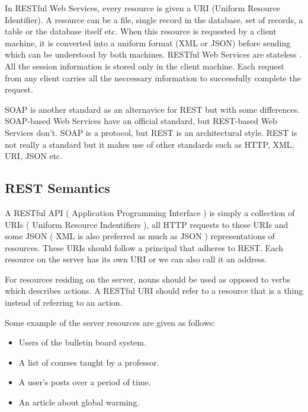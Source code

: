 \hspace*{0.2in}In RESTful Web Services, every resource is given a URI (Uniform Resource Identifier). A resource can be a file, single record in the database, set of records, a table or the database itself etc. When this resource is requested by a client machine, it is converted into a uniform format (XML or JSON) before sending which can be understood by both machines.  RESTful Web Services are stateless \cite{stateless}. All the session information is stored only in the client machine. Each request from any client carries all the neccessary information to successfully complete the request.

\hspace*{0.2in}SOAP \cite{soap} is another standard as an alternavice for REST but with some differences. SOAP-based Web Services have an official standard, but REST-based Web Services don't.  SOAP is a protocol, but REST is an architectural style. REST is not really a standard but it makes use of other standards such as HTTP, XML, URI, JSON etc.

\subsection{REST Semantics}

\hspace*{0.2in}A RESTful API ( Application Programming Interface ) is simply a collection of URIs ( Uniform Resource Indentifiers ), all HTTP requests to these URIs and some JSON ( XML is also preferred as much as JSON ) representations of resources. These URIs should follow a principal that adheres to REST. Each resource on the server has its own URI or we can also call it an address.

\hspace*{0.2in}For resources residing on the server, nouns should be used as opposed to verbs which describes actions. A RESTful URI should refer to a resource that is a thing instead of referring to an action\cite{restnaming}.

\hspace*{0.2in}Some example of the server resources are given as follows:
\begin{itemize}
\item Users of the bulletin board system.
\item A list of courses taught by a professor.
\item A user's posts over a period of time.
\item An article about global warming.
\end{itemize}

